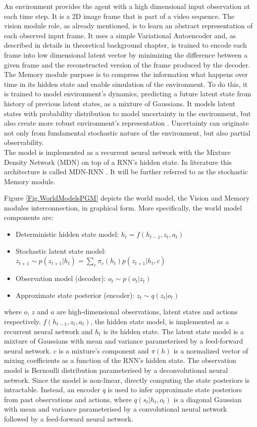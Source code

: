 An environment provides the agent with a high dimensional input observation at each time step. It is a 2D image frame that is part of a video sequence. The vision module role, as already mentioned, is to learn an abstract representation of each observed input frame. It uses a simple Variational Autoencoder \cite{Algo.VAE} and, as described in details in theoretical background chapter, is trained to encode each frame into low dimensional latent vector by minimizing the difference between a given frame and the reconstructed version of the frame produced by the decoder. \\
The Memory module purpose is to compress the information what happens over time in its hidden state and enable simulation of the environment. To do this, it is trained to model environment's dynamics, predicting a future latent state from history of previous latent states, as a mixture of Gaussians. It models latent states with probability distribution to model uncertainty in the environment, but also create more robust environment's representation \cite{Algo.FastGenerativeModels}. Uncertainty can originate not only from fundamental stochastic nature of the environment, but also partial observability. \\
The model is implemented as a recurrent neural network with the Mixture Density Network (MDN) on top of a RNN's hidden state. In literature this architecture is called MDN-RNN \cite{Algo.MDNRNN}. It will be further referred to as the stochastic Memory module.


Figure \ref{Fig.WorldModelsPGM} depicts the world model, the Vision and Memory modules interconnection, in graphical form. More specifically, the world model components are:
\begin{itemize}
\item Deterministic hidden state model:      $h_t = f(h_{t-1}, z_{t}, a_{t})$
\item Stochastic latent state model:         $z_{t+1} \sim p(z_{t+1}|h_t) = \sum_c\pi_c(h_t)p(z_{t+1}|h_t, c)$
\item Observation model (decoder):           $o_t \sim p(o_t|z_t)$
\item Approximate state posterior (encoder): $z_t \sim q(z_t|o_t)$
\end{itemize}
where $o$, $z$ and $a$ are high-dimensional observations, latent states and actions respectively. $f(h_{t-1}, z_{t}, a_{t})$, the hidden state model, is implemented as a recurrent neural network and $h_t$ is its hidden state. The latent state model is a mixture of Gaussians with mean and variance parameterised by a feed-forward neural network. $c$ is a mixture's component and $\pi(h)$ is a normalized vector of mixing coefficients as a function of the RNN's hidden state. The observation model is Bernoulli distribution parameterised by a deconvolutional neural network. Since the model is non-linear, directly computing the state posteriors is intractable. Instead, an encoder $q$ is used to infer approximate state posteriors from past observations and actions, where $q(s_t | h_t, o_t)$ is a diagonal Gaussian with mean and variance parameterised by a convolutional neural network followed by a feed-forward neural network.

